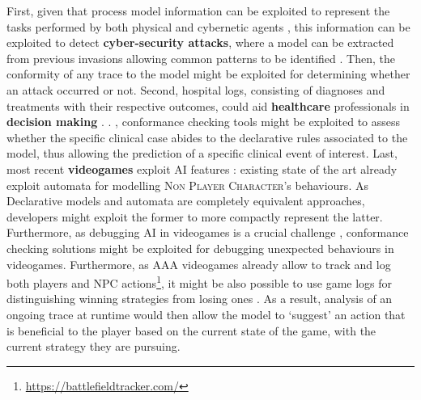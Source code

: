  First, given that process model information can be exploited to represent the tasks performed by both physical and cybernetic agents \cite{Ioanna}, this information can be exploited to detect \textbf{cyber-security attacks}, where a model can be extracted from previous invasions allowing common patterns to be identified \cite{BENASHER201551,LagraaS20}. Then, the conformity of any trace to the model might be exploited for determining whether an attack occurred or not. Second,  hospital logs, consisting of diagnoses and treatments with their respective outcomes, could aid \textbf{healthcare} professionals in  \textbf{decision making} \cite{Amantea2020}.  \cite{mining,KusumaKMHGJ20}. , conformance checking tools might be exploited to assess whether the specific clinical case abides to the declarative rules associated to the model, thus allowing the prediction of a specific clinical event of interest. Last, most recent \textbf{videogames}  exploit AI features \cite{LiGT21}: existing state of the art already exploit automata \cite{Miyake2017} for modelling \textsc{Non Player Character}'s behaviours. As Declarative models and automata are completely equivalent approaches, developers might exploit the former to more compactly represent the latter. Furthermore, as debugging AI in videogames is a crucial challenge \cite{john2019debugging}, conformance checking solutions might be exploited for debugging unexpected behaviours in videogames. Furthermore, as AAA videogames already allow to track and log both players and NPC actions\footnote{\url{https://battlefieldtracker.com/}}, it might be also possible to use game logs for distinguishing winning strategies from losing ones \cite{mining}. As a result, analysis of an ongoing trace at runtime would then allow the model to `suggest' an action that is beneficial to the player based on the current state of the game, with the current strategy they are pursuing.

